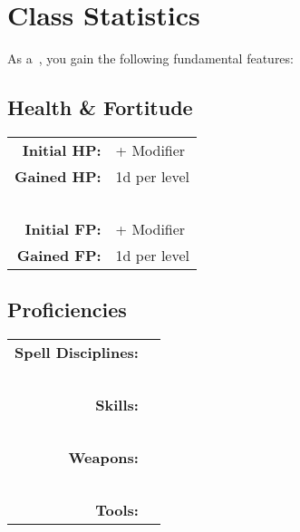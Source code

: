 {\begin{strip}
\begin{tcolorbox}
	     		{\large \begin{center} \bf \name \end{center}}
	     		\vspace{-1.3ex}
	     		
	     		\dndlineLong
	     	
	     			
				
		     		\if{}
						\if{}
							\tableLong
						\fi
						\if{}
							\if{}
								\extraTable
							\fi
							\if {}
								\doubleTable
							\fi
						\fi
					\fi
					\if{}
						\tableShort
					\fi
		
	     		
	     		\normalsize
	     		\dndlineLong
				
				
     	\end{tcolorbox}
		
		\if{}
		\end{strip}
		\fi
		
     	\section*{Class Statistics}
		
		As a\if{}\fi~\name{}, you gain the following fundamental features:
		
		\subsection{Health \& Fortitude}
		\def\w{6}
		\begin{tabular}{ r p{\w cm}}
			\bf Initial HP:	&	\hp{} + \attPhys{} Modifier
			\\
			\bf Gained HP:	&	1d\hp{} per \name{} level
			\\
			~
			\\
			\bf Initial FP:	&	\fp{} + \attInt{} Modifier
			\\
			\bf Gained FP:	&	1d\fp{} per \name{} level
		\end{tabular}

		
		\subsection{Proficiencies}
		\def\w{6}
		\begin{tabular}{ r p{\w cm}}
			\bf Spell Disciplines:	&	\disc
			\\
			~
			\\
			\bf Skills:	&	\prof
			\\
			~
			\\
			\bf Weapons:	&	\weapon
			\\
			~
			\\
			\bf Tools:	&	\tool
		\end{tabular}
		
}
